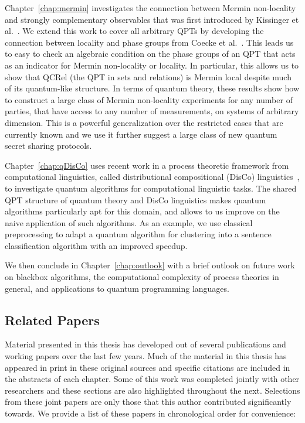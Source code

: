 Chapter~\ref{chap:mermin} investigates the connection between Mermin non-locality and strongly complementary observables that was first introduced by Kissinger et al.~\cite{coecke2012strong}. We extend this work to cover all arbitrary QPTs by developing the connection between locality and phase groups from Coecke et al.~\cite{coecke2011phase}. This leads us to easy to check an algebraic condition on the phase groups of an QPT that acts as an indicator for Mermin non-locality or locality. In particular, this allows us to show that QCRel (the QPT in sets and relations) is Mermin local despite much of its quantum-like structure. In terms of quantum theory, these results show how to construct a large class of Mermin non-locality experiments for any number of parties, that have access to any number of measurements, on systems of arbitrary dimension.  This is a powerful generalization over the restricted cases that are currently known and we use it further suggest a large class of new quantum secret sharing protocols.

Chapter~\ref{chap:qDisCo} uses recent work in a process theoretic framework from computational linguistics, called distributional compositional (DisCo) linguistics~\cite{clark2008compositional}, to investigate quantum algorithms for computational linguistic tasks. The shared QPT structure of quantum theory and DisCo linguistics makes quantum algorithms particularly apt for this domain, and allows to us improve on the naive application of such algorithms. As an example, we use classical preprocessing to adapt a quantum algorithm for clustering into a sentence classification algorithm with an improved speedup.

We then conclude in Chapter~\ref{chap:outlook} with a brief outlook on future work on blackbox algorithms, the computational complexity of process theories in general, and applications to quantum programming languages.
 
\subsection*{Related Papers}

Material presented in this thesis has developed out of several publications and working papers over the last few years. Much of the material in this thesis has appeared in print in these original sources and specific citations are included in the abstracts of each chapter. Some of this work was completed jointly with other researchers and these sections are also highlighted throughout the next.  Selections from these joint papers are only those that this author contributed significantly towards. We provide a list of these papers in chronological order for convenience:

